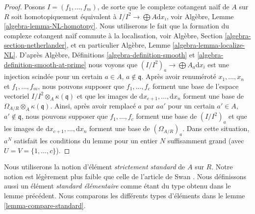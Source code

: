 \begin{proof}
Posons $I = (f_1, \ldots, f_m)$, de sorte que le complexe cotangent naïf de
$A$ sur $R$ soit homotopiquement équivalent à
$I/I^2 \to \bigoplus A\text{d}x_i$, voir
Algèbre, Lemme \ref{algebra-lemma-NL-homotopy}.
Nous utiliserons le fait que la formation du complexe cotangent naïf commute à
la localisation, voir Algèbre, Section \ref{algebra-section-netherlander},
et en particulier Algèbre, Lemme \ref{algebra-lemma-localize-NL}.
D'après Algèbre, Définitions \ref{algebra-definition-smooth} et
\ref{algebra-definition-smooth-at-prime}
nous voyons que $(I/I^2)_a \to \bigoplus A_a\text{d}x_i$ est une injection
scindée pour un certain $a \in A$, $a \not \in \mathfrak q$.
Après avoir renuméroté $x_1, \ldots, x_n$ et $f_1, \ldots, f_m$, nous pouvons
supposer que $f_1, \ldots, f_c$ forment une base de l'espace vectoriel
$I/I^2 \otimes_A \kappa(\mathfrak q)$ et que les images de
$\text{d}x_{c + 1}, \ldots, \text{d}x_n$ forment une base de
$\Omega_{A/R} \otimes_A \kappa(\mathfrak q)$. Ainsi, après avoir remplacé $a$
par $aa'$ pour un certain $a' \in A$, $a' \not \in \mathfrak q$, nous pouvons
supposer que $f_1, \ldots, f_c$ forment une base de $(I/I^2)_a$ et que les images
de $\text{d}x_{c + 1}, \ldots, \text{d}x_n$ forment une base de
$(\Omega_{A/R})_a$. Dans cette situation, $a^N$ satisfait les conditions du
lemme pour un entier $N$ suffisamment grand (avec $U = V = \{1, \ldots, c\}$).
\end{proof}

\noindent
Nous utiliserons la notion d'élément {\it strictement standard} de $A$ sur $R$.
Notre notion est légèrement plus faible que celle de l'article de Swan
\cite{swan}. Nous définissons aussi un élément {\it standard élémentaire}
comme étant du type obtenu dans le lemme précédent. Nous comparons les
différents types d'éléments dans le lemme \ref{lemma-compare-standard}.


